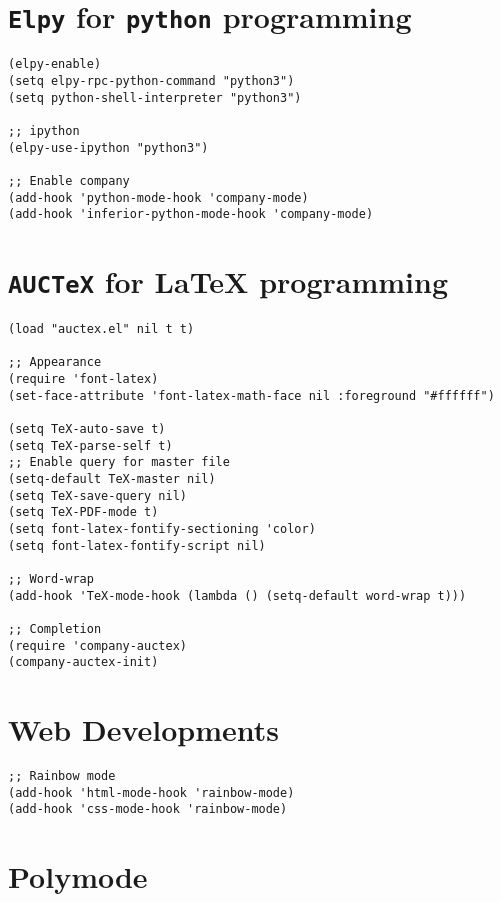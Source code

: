 \documentclass[11pt]{article}
\begin{document}
\section{\texttt{Elpy} for \texttt{python} programming}
\label{sec:orgd776d71}

\begin{verbatim}
(elpy-enable)				
(setq elpy-rpc-python-command "python3")
(setq python-shell-interpreter "python3")

;; ipython
(elpy-use-ipython "python3")

;; Enable company
(add-hook 'python-mode-hook 'company-mode)
(add-hook 'inferior-python-mode-hook 'company-mode)
\end{verbatim}

\section{\texttt{AUCTeX} for \LaTeX{} programming}
\label{sec:org44a1fcb}
\begin{verbatim}
(load "auctex.el" nil t t)

;; Appearance
(require 'font-latex)
(set-face-attribute 'font-latex-math-face nil :foreground "#ffffff")

(setq TeX-auto-save t)			    
(setq TeX-parse-self t)
;; Enable query for master file
(setq-default TeX-master nil)		    
(setq TeX-save-query nil)		    
(setq TeX-PDF-mode t)			    
(setq font-latex-fontify-sectioning 'color) 
(setq font-latex-fontify-script nil)	    

;; Word-wrap
(add-hook 'TeX-mode-hook (lambda () (setq-default word-wrap t)))

;; Completion
(require 'company-auctex)
(company-auctex-init)

\end{verbatim}

\section{Web Developments}
\label{sec:org4a064f8}
\begin{verbatim}
;; Rainbow mode
(add-hook 'html-mode-hook 'rainbow-mode)
(add-hook 'css-mode-hook 'rainbow-mode)
\end{verbatim}
\section{Polymode}
\label{sec:orge5b7755}
\end{document}
